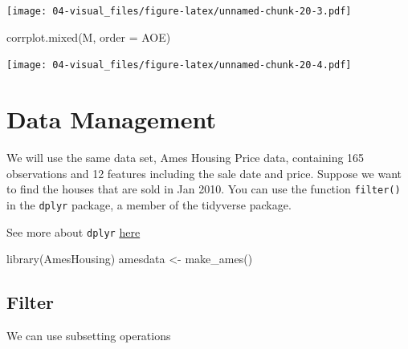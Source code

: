 \documentclass[
]{book}
\newenvironment{Shaded}{\begin{snugshade}}{\end{snugshade}}
\newcommand{\AttributeTok}[1]{\textcolor[rgb]{0.77,0.63,0.00}{#1}}
\newcommand{\DecValTok}[1]{\textcolor[rgb]{0.00,0.00,0.81}{#1}}
\newcommand{\FunctionTok}[1]{\textcolor[rgb]{0.00,0.00,0.00}{#1}}
\newcommand{\NormalTok}[1]{#1}
\newcommand{\OtherTok}[1]{\textcolor[rgb]{0.56,0.35,0.01}{#1}}
\newcommand{\SpecialCharTok}[1]{\textcolor[rgb]{0.00,0.00,0.00}{#1}}
\newcommand{\StringTok}[1]{\textcolor[rgb]{0.31,0.60,0.02}{#1}}
\theoremstyle{definition}
\theoremstyle{definition}
\theoremstyle{definition}
\theoremstyle{definition}
\theoremstyle{remark}
\begin{document}
\texttt{[image: 04-visual\_files/figure-latex/unnamed-chunk-20-3.pdf]}

\begin{Shaded}
\begin{Highlighting}[]
\FunctionTok{corrplot.mixed}\NormalTok{(M, }\AttributeTok{order =} \StringTok{\textquotesingle{}AOE\textquotesingle{}}\NormalTok{)}
\end{Highlighting}
\end{Shaded}

\texttt{[image: 04-visual\_files/figure-latex/unnamed-chunk-20-4.pdf]}

\hypertarget{data-management}{%
\chapter{Data Management}\label{data-management}}

We will use the same data set, Ames Housing Price data, containing 165 observations and 12 features including the sale date and price. Suppose we want to find the houses that are sold in Jan 2010. You can use the function \texttt{filter()} in the \texttt{dplyr} package, a member of the tidyverse package.

See more about \texttt{dplyr} \href{https://dplyr.tidyverse.org/articles/dplyr.html}{here}

\begin{Shaded}
\begin{Highlighting}[]
\FunctionTok{library}\NormalTok{(AmesHousing)}
\NormalTok{amesdata }\OtherTok{\textless{}{-}} \FunctionTok{make\_ames}\NormalTok{()}
\end{Highlighting}
\end{Shaded}

\hypertarget{filter}{%
\section{Filter}\label{filter}}

We can use subsetting operations

\begin{Shaded}
\end{Shaded}
\end{document}
